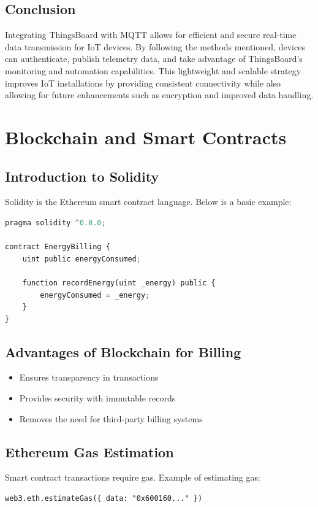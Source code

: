 \documentclass[a4paper,12pt]{report}
\begin{document}
 \section{Conclusion}
 Integrating ThingsBoard with MQTT allows for efficient and secure real-time data transmission for IoT devices. By following the methods mentioned, devices can authenticate, publish telemetry data, and take advantage of ThingsBoard's monitoring and automation capabilities. This lightweight and scalable strategy improves IoT installations by providing consistent connectivity while also allowing for future enhancements such as encryption and improved data handling.

\chapter{Blockchain and Smart Contracts}
\section{Introduction to Solidity}
Solidity is the Ethereum smart contract language. Below is a basic example:
\begin{lstlisting}[language=python]
pragma solidity ^0.8.0;

contract EnergyBilling {
    uint public energyConsumed;

    function recordEnergy(uint _energy) public {
        energyConsumed = _energy;
    }
}
\end{lstlisting}

\section{Advantages of Blockchain for Billing}
\begin{itemize}
    \item Ensures transparency in transactions
    \item Provides security with immutable records
    \item Removes the need for third-party billing systems
\end{itemize}

\section{Ethereum Gas Estimation}
Smart contract transactions require gas. Example of estimating gas:
\begin{lstlisting}
web3.eth.estimateGas({ data: "0x600160..." })
\end{lstlisting}
\end{document}
